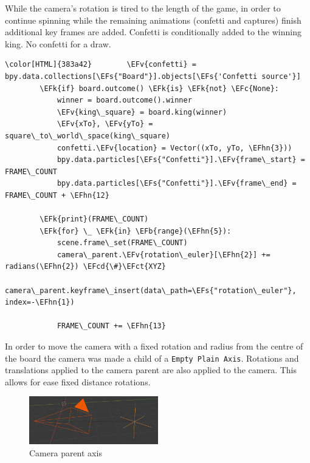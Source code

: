 \documentclass[11pt]{article}
\newcommand{\EFk}[1]{\textcolor{EFk}{#1}} %
\newcommand{\EFs}[1]{\textcolor{EFs}{#1}} %
\newcommand{\EFb}[1]{\textcolor{EFb}{#1}} %
\newcommand{\EFct}[1]{\textcolor{EFct}{#1}} %
\newcommand{\EFc}[1]{\textcolor{EFc}{#1}} %
\newcommand{\EFv}[1]{\textcolor{EFv}{#1}} %
\newcommand{\EFcd}[1]{\textcolor{EFcd}{#1}} %
\newcommand{\EFhn}[1]{\textcolor{EFhn}{\textbf{#1}}} %
\begin{document}
While the camera's rotation is tired to the length of the game, in order to
continue spinning while the remaining animations (confetti and captures) finish additional key frames
are added. Confetti is conditionally added to the winning king. No confetti for a draw.
\begin{Code}
\begin{Verbatim}[]
\color[HTML]{383a42}        \EFv{confetti} = bpy.data.collections[\EFs{"Board"}].objects[\EFs{'Confetti source'}]
        \EFk{if} board.outcome() \EFk{is} \EFk{not} \EFc{None}:
            winner = board.outcome().winner
            \EFv{king\_square} = board.king(winner)
            \EFv{xTo}, \EFv{yTo} = square\_to\_world\_space(king\_square)
            confetti.\EFv{location} = Vector((xTo, yTo, \EFhn{3}))
            bpy.data.particles[\EFs{"Confetti"}].\EFv{frame\_start} = FRAME\_COUNT
            bpy.data.particles[\EFs{"Confetti"}].\EFv{frame\_end} = FRAME\_COUNT + \EFhn{12}

        \EFk{print}(FRAME\_COUNT)
        \EFk{for} \_ \EFk{in} \EFb{range}(\EFhn{5}):
            scene.frame\_set(FRAME\_COUNT)
            camera\_parent.\EFv{rotation\_euler}[\EFhn{2}] += radians(\EFhn{2}) \EFcd{\#}\EFct{XYZ}
            camera\_parent.keyframe\_insert(data\_path=\EFs{"rotation\_euler"}, index=-\EFhn{1})

            FRAME\_COUNT += \EFhn{13}
\end{Verbatim}
\end{Code}
In order to move the camera with a fixed rotation and radius from the centre of
the board the camera was made a child of a \texttt{Empty Plain Axis}. Rotations and
translations applied to the camera parent are also applied to the camera. This
allows for ease fixed distance rotations.
\begin{figure}[htbp]
\centering
\includegraphics[width=0.5\textwidth]{Images/camera parent.png}
\caption{\label{camera-parent}Camera parent axis}
\end{figure}
\end{document}
